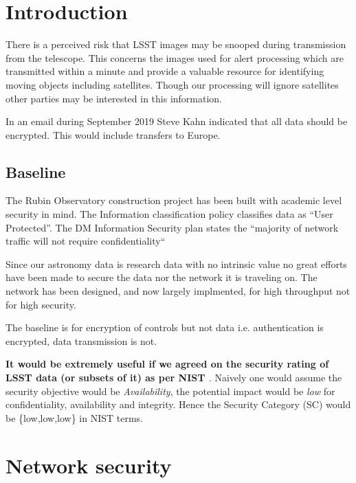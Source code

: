 \section{Introduction} \label{sec:intro}

There is a perceived  risk that LSST  images may be snooped during transmission from the telescope. This concerns the images used for alert processing which are transmitted within a minute and provide a valuable resource for identifying moving objects including satellites. Though our processing will ignore satellites other parties may be interested in this information.

In an email during September 2019 Steve Kahn indicated that all data should be encrypted. This would include transfers to Europe.


\subsection{Baseline }
The Rubin Observatory construction project has been built with academic level security in mind.
The
 Information classification policy  classifies data as  “User Protected”.
The DM Information Security plan  states the “majority of network traffic will not require confidentiality“

Since our astronomy data is research data with no intrinsic value no great efforts have been made to secure the
data nor the network it is traveling on.
The network has been designed, and now largely implmented, for high throughput not for high security.

The baseline is for encryption of controls but not data i.e. authentication is encrypted, data transmission is not.

{\bf It would be extremely useful if we agreed on the security rating of LSST data (or subsets of it)  as per NIST  \citep{nist800-60}}.
Naively one would assume the security objective would be \emph{Availability}, the potential impact would be \emph{low} for confidentiality, availability and integrity. Hence  the Security Category (SC) would be \{low,low,low\} in NIST terms.



\section{Network security}\label{sec:net}

